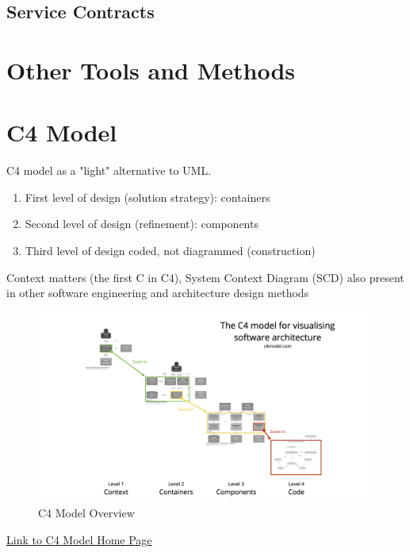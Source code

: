 \documentclass[../Main.tex]{subfiles}
\begin{document}
\subsection{Service Contracts}

\section{Other Tools and Methods}
\section{C4 Model}
C4 model as a "light" alternative to UML. 
\begin{enumerate}
    \item First level of design (solution strategy): containers
    \item Second level of design (refinement): components
    \item Third level of design coded, not diagrammed (construction)
\end{enumerate}

Context matters (the first C in C4), System Context Diagram (SCD) also present in other software engineering and architecture design methods

\begin{figure}[H]
    \centering
    \includegraphics[]{Images/c4-overview.png}
    \caption{C4 Model Overview}
\end{figure}
\href{https://c4model.com/}{Link to C4 Model Home Page}
\end{document}
